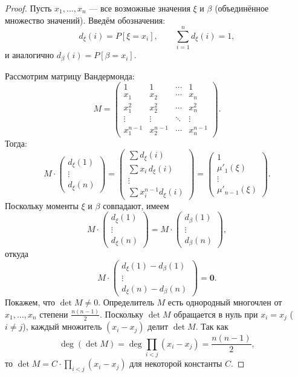 \begin{proof}
Пусть $x_1, \ldots, x_n$ — все возможные значения $\xi$ и $\beta$ (объединённое множество значений).
Введём обозначения:
\[
d_\xi(i) = P[\xi = x_i], \qquad \sum_{i=1}^n d_\xi(i) = 1,
\]
и аналогично $d_\beta(i) = P[\beta = x_i]$.

Рассмотрим матрицу Вандермонда:
\[
M =
\begin{pmatrix}
	1      & 1      & \cdots & 1      \\
	x_1    & x_2    & \cdots & x_n    \\
	x_1^2  & x_2^2  & \cdots & x_n^2  \\
	\vdots & \vdots & \ddots & \vdots \\
	x_1^{n-1} & x_2^{n-1} & \cdots & x_n^{n-1}
\end{pmatrix}.
\]
Тогда:
\[
M \cdot
\begin{pmatrix} d_\xi(1) \\ \vdots \\ d_\xi(n) \end{pmatrix}
=
\begin{pmatrix}
	\sum d_\xi(i) \\
	\sum x_i\, d_\xi(i) \\
	\vdots \\
	\sum x_i^{n-1} d_\xi(i)
\end{pmatrix}
=
\begin{pmatrix}
	1 \\ \mu'_1(\xi) \\ \vdots \\ \mu'_{n-1}(\xi)
\end{pmatrix}.
\]
Поскольку моменты $\xi$ и $\beta$ совпадают, имеем
\[
M \cdot \begin{pmatrix} d_\xi(1) \\ \vdots \\ d_\xi(n) \end{pmatrix}
=
M \cdot \begin{pmatrix} d_\beta(1) \\ \vdots \\ d_\beta(n) \end{pmatrix},
\]
откуда
\[
M \cdot
\begin{pmatrix} d_\xi(1) - d_\beta(1) \\ \vdots \\ d_\xi(n) - d_\beta(n) \end{pmatrix}
= \mathbf{0}.
\]
Покажем, что $\det M \neq 0$. Определитель $M$ есть однородный многочлен от $x_1, \ldots, x_n$
степени $\frac{n(n-1)}{2}$. Поскольку $\det M$ обращается в нуль при $x_i = x_j$ ($i \neq j$),
каждый множитель $(x_i - x_j)$ делит $\det M$. Так как
\[
\deg(\det M) = \deg\!\prod_{i < j}(x_i - x_j) = \frac{n(n-1)}{2},
\]
то $\det M = C \cdot \prod_{i < j}(x_i - x_j)$ для некоторой константы $C$.


\end{proof}
